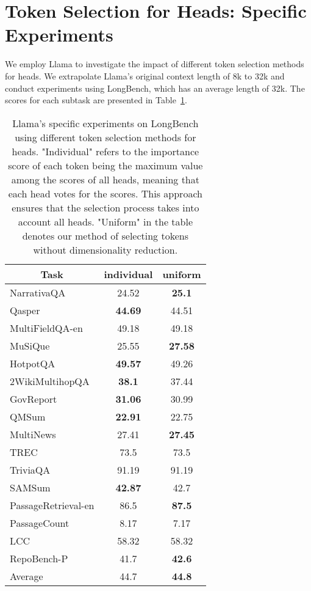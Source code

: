 \section{Token Selection for Heads: Specific Experiments}
\label{sec:Token_Selection_for_Heads}
We employ Llama to investigate the impact of different token selection methods for heads. 
We extrapolate Llama's original context length of 8k to 32k and conduct experiments using LongBench, which has an average length of 32k.
The scores for each subtask are presented in Table~\ref{tab:token_selection_head_subtask}.
\begin{table}[]
\centering
  \begin{tabular}{l|cc}
  \hline
  \multicolumn{1}{c|}{Task} & individual     & uniform        \\ \hline
  NarrativaQA               & 24.52          & \textbf{25.1}  \\
  Qasper                    & \textbf{44.69} & 44.51          \\
  MultiFieldQA-en           & 49.18          & 49.18          \\
  MuSiQue                   & 25.55          & \textbf{27.58} \\
  HotpotQA                  & \textbf{49.57} & 49.26          \\
  2WikiMultihopQA           & \textbf{38.1}  & 37.44          \\
  GovReport                 & \textbf{31.06} & 30.99          \\
  QMSum                     & \textbf{22.91} & 22.75          \\
  MultiNews                 & 27.41          & \textbf{27.45} \\
  TREC                      & 73.5           & 73.5           \\
  TriviaQA                  & 91.19          & 91.19          \\
  SAMSum                    & \textbf{42.87} & 42.7           \\
  PassageRetrieval-en       & 86.5           & \textbf{87.5}  \\
  PassageCount              & 8.17           & 7.17           \\
  LCC                       & 58.32          & 58.32          \\
  RepoBench-P               & 41.7           & \textbf{42.6}  \\ \hline
  Average                   & 44.7           & \textbf{44.8}           \\ \hline
  \end{tabular}
  \caption{Llama's specific experiments on LongBench using different token selection methods for heads. "Individual" refers to the importance score of each token being the maximum value among the scores of all heads, meaning that each head votes for the scores. This approach ensures that the selection process takes into account all heads. "Uniform" in the table denotes our method of selecting tokens without dimensionality reduction.}
  \label{tab:token_selection_head_subtask}
  \end{table}


